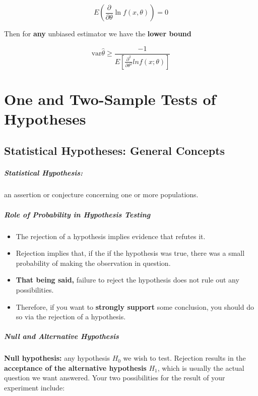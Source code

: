 \documentclass[a4paper,12pt]{report}
\begin{document}
$$E(\frac{\partial}{\partial \theta} \ln f(x, \theta)) = 0$$

Then for \textbf{any} unbiased estimator we have the \textbf{lower bound} 

$$\text{var} \hat{\theta} \geq \frac{-1}{E[\frac{\partial^2}{\partial \theta^2} ln f(x; \theta)]}$$


\chapter{One and Two-Sample Tests of Hypotheses}

\section{Statistical Hypotheses: General Concepts}

\paragraph{Statistical Hypothesis: } an assertion or conjecture concerning one or more populations.

\paragraph{Role of Probability in Hypothesis Testing} 
\begin{itemize}
\item The rejection of a hypothesis implies evidence that refutes it. 
\item Rejection implies that, if the if the hypothesis was true, there was a small probability of making the observation in question.
\item \textbf{That being said,} failure to reject the hypothesis does not rule out any possibilities.
\item Therefore, if you want to \textbf{strongly support} some conclusion, you should do so via the rejection of a hypothesis.
\end{itemize}

\paragraph{Null and Alternative Hypothesis} 

\textbf{Null hypothesis: } any hypothesis $H_0$ we wish to test. Rejection results in the \textbf{acceptance of the alternative hypothesis} $H_1$, which is usually the actual question we want answered. Your two possibilities for the result of your experiment include:
\end{document}
